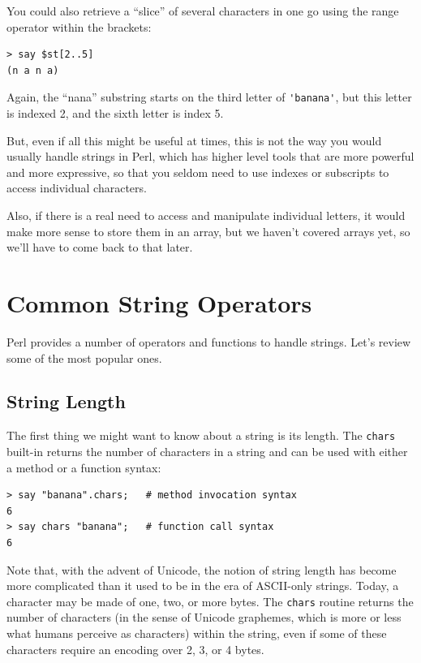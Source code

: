You could also retrieve a ``slice'' of several characters in 
one go using the range operator within the brackets:

\begin{verbatim}
> say $st[2..5]
(n a n a)
\end{verbatim}
%
Again, the ``nana'' substring starts on the third letter of 
\verb"'banana'", but this letter is indexed 2, and the sixth letter is index 5. 

But, even if all this might be useful at times, this is 
not the way you would usually handle strings in Perl, 
which has higher level tools that are more powerful and more 
expressive, so that you seldom need to use indexes or 
subscripts to access individual characters.

Also, if there is a real need to access and manipulate 
individual letters, it would make more sense to store 
them in an array, but we haven't covered arrays yet, so 
we'll have to come back to that later.


\section{Common String Operators}

Perl provides a number of operators and functions to 
handle strings. Let's review some of the most popular ones.

\subsection{String Length}

The first thing we might want to know about a string is its length. The {\tt chars} built-in returns the number of characters 
in a string and can be used with either a method or a function 
syntax:

\begin{verbatim}
> say "banana".chars;   # method invocation syntax
6
> say chars "banana";   # function call syntax
6
\end{verbatim}
%

Note that, with the advent of Unicode, the notion of 
string length has 
become more complicated than it used to be in the era
of ASCII-only strings. Today, a character may be made of one,
two, or more bytes. The {\tt chars} routine returns the 
number of characters (in the sense of Unicode graphemes, which
is more or less what humans perceive as characters) within 
the string, even if some of these characters require an 
encoding over 2, 3, or 4 bytes.

